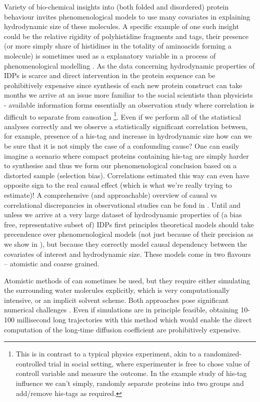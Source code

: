 \documentclass{doctoral}
\begin{document}
Variety of bio-chemical insights into (both folded and disordered) protein behaviour invites phenomenological models to use many covariates in explaining hydrodynamic size of these molecules.
A specific example of one such insight could be the relative rigidity of polyhistidine fragments and tags, their presence (or more simply share of histidines in the totality of aminoacids forming a molecule) is sometimes used as a explanatory variable in a process of phenomenological modelling \cite{Tomasso_2016,Marsh_2010}.
As the data concerning hydrodynamic properties of IDPs is scarce and direct intervention in the protein sequence can be prohibitively expensive since synthesis of each new protein construct can take months we arrive at an issue more familiar to the social scientists than physicists - available information forms essentially an observation study where correlation is difficult to separate from causation \footnote{ This is in contrast to a typical physics experiment, akin to a randomized-controlled trial in social setting, where experimenter is free to chose value of controll variable and measure the outcome.
    In the example study of his-tag influence we can't simply, randomly separate proteins into two groups and add/remove his-tags as required.
}.
Even if we perform all of the statistical analyses correctly and we observe a statistically significant correlation between, for example, presence of a his-tag and increase in hydrodynamic size how can we be sure that it is not simply the case of a confounding cause?
One can easily imagine a scenario where compact proteins containing his-tag are simply harder to synthesise and thus we form our phenomenological conclusion based on a distorted sample (selection bias).
Correlations estimated this way can even have opposite sign to the real causal effect (which is what we're really trying to estimate)!
A comprehensive (and approachable) overview of causal vs correlational discrepancies in observational studies can be fond in \textcite{Cinelli_2022}.
Until and unless we arrive at a very large dataset of hydrodynamic properties of (a bias free, representative subset of) IDPs first principles theoretical models should take precendence over phenomenological models (not just because of their precision as we show in \textcite{Waszkiewicz_2024_mda}), but because they correctly model causal dependency between the covariates of interest and hydrodynamic size.
These models come in two flavours -- atomistic and coarse grained.

Atomistic methods of can sometimes be used\cite{Karplus_1990}, but they require either simulating the surrounding water molecules explicitly, which is very computationally intensive, or an implicit solvent scheme.
Both approaches pose significant numerical challenges \cite{Frenkel_2001}.
Even if simulations are in principle feasible, obtaining 10-100 millisecond long trajectories with this method which would enable the direct computation of the long-time diffusion coefficient are prohibitively expensive.
\end{document}
